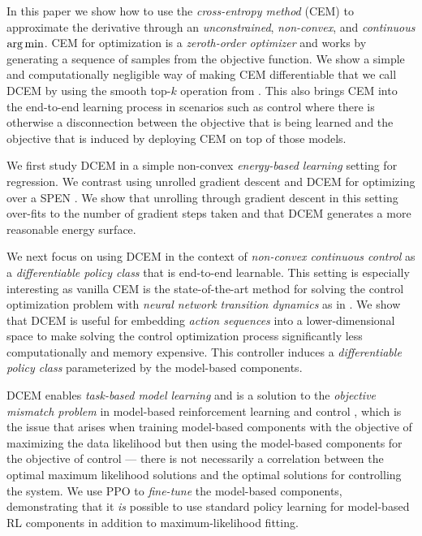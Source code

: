 \documentclass{article}
\begin{document}
In this paper we show how to use the \emph{cross-entropy method} (CEM)
\citep{rubinstein1997optimization,de2005tutorial}
to approximate the derivative through an
\emph{unconstrained}, \emph{non-convex}, and \emph{continuous}
$\operatorname*{arg\,min}$.
CEM for optimization is a \emph{zeroth-order optimizer} and works by
generating a sequence of samples from the objective function.
We show a simple and computationally negligible
way of making CEM differentiable that we call DCEM
by using the smooth top-$k$ operation from \citet{amos2019limited}.
This also brings CEM into the end-to-end learning process in scenarios
such as control where there is otherwise a disconnection between the
objective that is being learned and the objective that is induced by
deploying CEM on top of those models.

We first study DCEM in a simple non-convex
\emph{energy-based learning} setting for regression.
We contrast using unrolled gradient descent and DCEM
for optimizing over a SPEN \citep{belanger2016structured}.
We show that unrolling through gradient descent in this
setting over-fits to the number of gradient steps taken
and that DCEM generates a more reasonable energy surface.

We next focus on using DCEM in
the context of \emph{non-convex continuous control}
as a \emph{differentiable policy class} that is end-to-end learnable.
This setting is especially interesting as vanilla CEM is
the state-of-the-art method for solving the
control optimization problem with \emph{neural network transition dynamics}
as in \citet{chua2018deep,hafner2018learning}.
We show that DCEM is useful for embedding \emph{action sequences}
into a lower-dimensional space to make solving the
control optimization process significantly less
computationally and memory expensive.
This controller induces a \emph{differentiable policy class}
parameterized by the model-based components.

DCEM enables \emph{task-based model learning} \citep{donti2017task}
and is a solution to the
\emph{objective mismatch problem}
in model-based reinforcement learning and control \citep{lambert2020objective},
which is the issue that arises when training model-based components with
the objective of maximizing the data likelihood but then using the
model-based components for the objective of control ---
there is not necessarily a correlation between the optimal maximum
likelihood solutions and the optimal solutions for controlling the system.
We use PPO \citep{schulman2017proximal} to
\emph{fine-tune} the model-based components, demonstrating that it \emph{is}
possible to use standard policy learning for model-based RL components in
addition to maximum-likelihood fitting.
\end{document}
